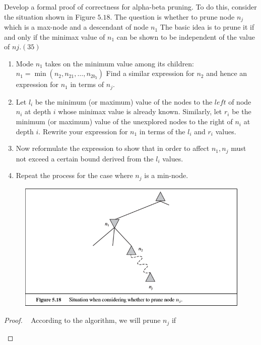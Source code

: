 \begin{exercise}[Search]{Develop a formal proof of correctness for alpha-beta pruning. To do this,
  consider the situation shown in Figure $5.18 .$ The question is whether to prune node $n_{j}$ which is a max-node and a descendant of node $n_{1}$ The basic idea is to prune it if and
  only if the minimax value of $n_{1}$ can be shown to be independent of the value of $n j .(35)$
  \begin{enumerate}
    \item Mode $n_{1}$ takes on the minimum value among its children: $n_{1}=\min \left(n_{2}, n_{21}, \ldots, n_{2 b_{2}}\right)$ Find a similar expression for $n_{2}$ and hence an expression for $n_{1}$ in terms of $n_{j}$.
    \item Let $l_{i}$ be the minimum (or maximum) value of the nodes to the $l e f t$ of node $n_{i}$ at depth $i$ whose minimax value is already known. Similarly, let $r_{i}$ be the minimum (or maximum) value of the unexplored nodes to the right of $n_{i}$ at depth $i .$ Rewrite your expression for $n_{1}$ in terms of the $l_{i}$ and $r_{i}$ values.
    \item Now reformulate the expression to show that in order to affect $n_{1}, n_{j}$ must not exceed a certain bound derived from the $l_{i}$ values.
    \item Repeat the process for the case where $n_{j}$ is a min-node.
  \end{enumerate}
  \begin{figure}
    \begin{center}
      \includegraphics[width=12cm]{img/ex1-1.png}
    \end{center}
  \end{figure}
  }
  \begin{proof}
  \par{~}
According to the algorithm, we will prune $n_j$ if 
  \begin{itemize}

\end{itemize}
\end{proof}
\end{exercise}
